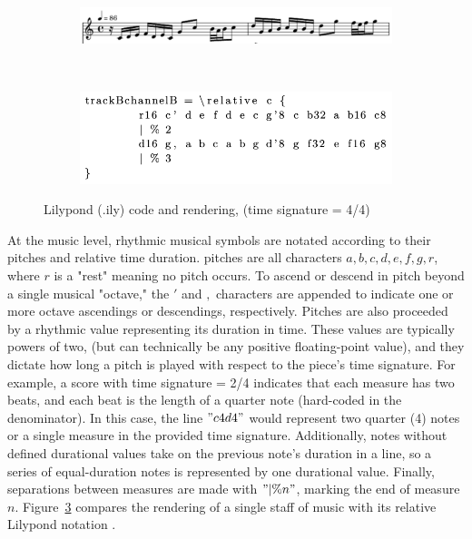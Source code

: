 \documentclass[review,sigconf]{acmart}
\begin{document}
\begin{figure}
	\begin{subfigure}
		\centering
		\includegraphics[width = .8\linewidth]{./figures/lilypond-snippet.png}
		\label{fig:lilypond-snippet}
	\end{subfigure}
	~
	\begin{subfigure}
		\centering
		\includegraphics[width = .8\linewidth]{./figures/lilypond-code.png}
		\label{fig:lilypond-code}
	\end{subfigure}
	\caption{Lilypond (.ily) code and rendering, (time signature = 4/4)}
	\label{fig:lilypond-example}
\end{figure}

At the music level, rhythmic musical symbols are notated according to their pitches and relative time duration.
pitches are all characters ${a, b, c, d, e, f, g, r}$, where $r$ is a "rest" meaning no pitch occurs.
To ascend or descend in pitch beyond a single musical "octave," the $'$ and $,$ characters are appended to indicate one or more octave ascendings or descendings, respectively.
Pitches are also proceeded by a rhythmic value representing its duration in time.
These values are typically powers of two, (but can technically be any positive floating-point value), and they dictate how long a pitch is played with respect to the piece's time signature.
For example, a score with time signature = 2/4 indicates that each measure has two beats, and each beat is the length of a quarter note (hard-coded in the denominator).
In this case, the line $"c4 d4"$ would represent two quarter (4) notes or a single measure in the provided time signature.
Additionally, notes without defined durational values take on the previous note's duration in a line, so a series of equal-duration notes is represented by one durational value.
Finally, separations between measures are made with $"| \% n"$, marking the end of measure $n$.
Figure~\ref{fig:lilypond-example} compares the rendering of a single staff of music with its relative Lilypond notation .
\end{document}
